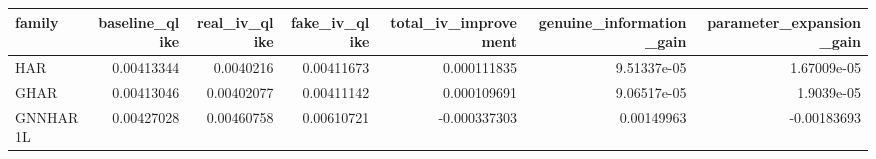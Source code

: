 \begin{tabular}{lrrrrrr}
\toprule
family & baseline_qlike & real_iv_qlike & fake_iv_qlike & total_iv_improvement & genuine_information_gain & parameter_expansion_gain \\
\midrule
HAR & 0.00413344 & 0.0040216 & 0.00411673 & 0.000111835 & 9.51337e-05 & 1.67009e-05 \\
GHAR & 0.00413046 & 0.00402077 & 0.00411142 & 0.000109691 & 9.06517e-05 & 1.9039e-05 \\
GNNHAR1L & 0.00427028 & 0.00460758 & 0.00610721 & -0.000337303 & 0.00149963 & -0.00183693 \\
\bottomrule
\end{tabular}
